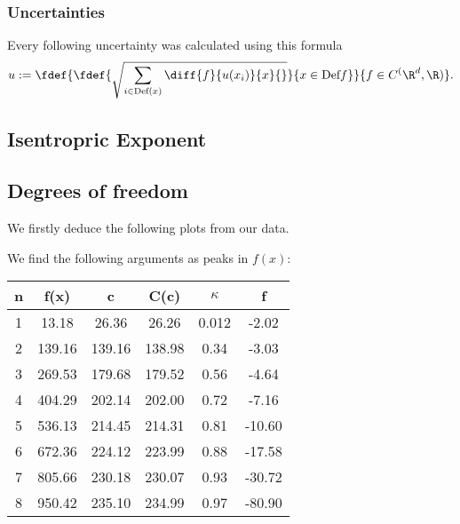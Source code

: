 \documentclass[../main.tex]{subfiles}
\begin{document}
    \subsubsection*{Uncertainties}
        Every following uncertainty was calculated using this formula
        \[u:=\fdef{\fdef{\sqrt{\sum_{i\in\text{Def}(x)}\diff{f}{u(x_i)}{x}{}}}{x\in\text{Def}{f}}}{f\in C^(\R^d,\R)}.\]
		        
        
    \subsection{Isentropric Exponent}

    \subsection{Degrees of freedom}
        We firstly deduce the following plots from our data. 
        
        

        
        
        We find the following arguments as peaks in $f(x)$:
        \begin{table}[H]
            \centering
            \begin{tabular}{c|c|c|c|c|c}
                n & f(x)    & c       & C(c)    & $\kappa$ & f\\
                \hline
                1 & 13.18   & 26.36   & 26.26   & 0.012 & -2.02 \\
                2 & 139.16  & 139.16  & 138.98  & 0.34  & -3.03  \\
                3 & 269.53  & 179.68  & 179.52  & 0.56  & -4.64  \\
                4 & 404.29  & 202.14  & 202.00  & 0.72  & -7.16  \\
                5 & 536.13  & 214.45  & 214.31  & 0.81  & -10.60 \\
                6 & 672.36  & 224.12  & 223.99  & 0.88  & -17.58 \\
                7 & 805.66  & 230.18  & 230.07  & 0.93  & -30.72 \\
                8 & 950.42  & 235.10  & 234.99  & 0.97  & -80.90
            \end{tabular}
        \end{table}

        
\end{document}
